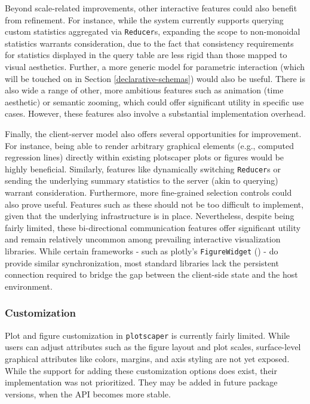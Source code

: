 \documentclass[
  openany]{book}
\theoremstyle{definition}
\theoremstyle{definition}
\theoremstyle{definition}
\theoremstyle{definition}
\theoremstyle{remark}
\begin{document}
Beyond scale-related improvements, other interactive features could also benefit from refinement. For instance, while the system currently supports querying custom statistics aggregated via \texttt{Reducer}s, expanding the scope to non-monoidal statistics warrants consideration, due to the fact that consistency requirements for statistics displayed in the query table are less rigid than those mapped to visual aesthetics. Further, a more generic model for parametric interaction (which will be touched on in Section \ref{declarative-schemas}) would also be useful. There is also wide a range of other, more ambitious features such as animation (time aesthetic) or semantic zooming, which could offer significant utility in specific use cases. However, these features also involve a substantial implementation overhead.

Finally, the client-server model also offers several opportunities for improvement. For instance, being able to render arbitrary graphical elements (e.g., computed regression lines) directly within existing plotscaper plots or figures would be highly beneficial. Similarly, features like dynamically switching \texttt{Reducer}s or sending the underlying summary statistics to the server (akin to querying) warrant consideration. Furthermore, more fine-grained selection controls could also prove useful. Features such as these should not be too difficult to implement, given that the underlying infrastructure is in place.
Nevertheless, despite being fairly limited, these bi-directional communication features offer significant utility and remain relatively uncommon among prevailing interactive visualization libraries. While certain frameworks - such as plotly's \texttt{FigureWidget} () - do provide similar synchronization, most standard libraries lack the persistent connection required to bridge the gap between the client-side state and the host environment.

\subsubsection{Customization}\label{customization}

Plot and figure customization in \texttt{plotscaper} is currently fairly limited. While users can adjust attributes such as the figure layout and plot scales, surface-level graphical attributes like colors, margins, and axis styling are not yet exposed. While the support for adding these customization options does exist, their implementation was not prioritized. They may be added in future package versions, when the API becomes more stable.
\end{document}
